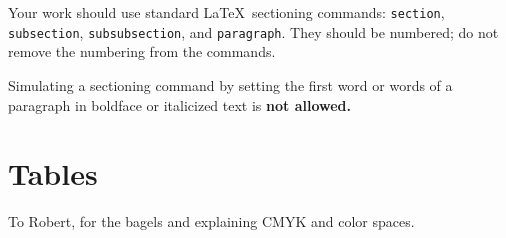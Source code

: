 \documentclass[acmtog]{acmart}
\begin{document}
Your work should use standard \LaTeX\ sectioning commands:
\verb|section|, \verb|subsection|, \verb|subsubsection|, and
\verb|paragraph|. They should be numbered; do not remove the numbering
from the commands.

Simulating a sectioning command by setting the first word or words of
a paragraph in boldface or italicized text is {\bfseries not allowed.}

\section{Tables}




\begin{acks}
To Robert, for the bagels and explaining CMYK and color spaces.
\end{acks}




\appendix
\end{document}
